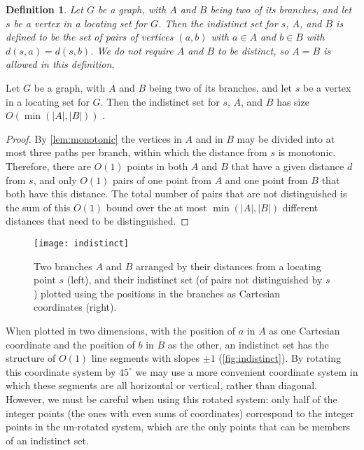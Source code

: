 \documentclass{jgaa-art}
\newtheorem{definition}{Definition}
\begin{document}
\begin{definition}
Let $G$ be a graph, with $A$ and $B$ being two of its branches, and let $s$ be a vertex in a locating set for $G$.
Then the \emph{indistinct set} for $s$, $A$, and $B$ is defined to be the set of pairs  of vertices $(a,b)$ with $a\in A$ and $b\in B$ with $d(s,a)=d(s,b)$. We do not require $A$ and $B$ to be distinct, so $A=B$ is allowed in this definition.
\end{definition}

\begin{lemma}
Let $G$ be a graph, with $A$ and $B$ being two of its branches, and let $s$ be a vertex in a locating set for $G$.
Then the indistinct set for $s$, $A$, and $B$ has size $O(\min(|A|,|B|))$ .
\end{lemma}

\begin{proof}
By \autoref{lem:monotonic} the vertices in $A$ and in $B$ may be divided into at most three paths per branch, within which the distance from $s$ is monotonic.
Therefore, there are $O(1)$ points in both $A$ and $B$ that have a given distance $d$ from $s$,
and only $O(1)$ pairs of one point from $A$ and one point from $B$ that both have this distance.
The total number of pairs that are not distinguished is the sum of this $O(1)$ bound over
the at most $\min(|A|,|B|)$ different distances that need to be distinguished.
\end{proof}

\begin{figure}[t]
\centering\texttt{[image: indistinct]}
\caption{Two branches $A$ and $B$ arranged by their distances from a locating point $s$ (left), and their indistinct set (of pairs not distinguished by $s$) plotted using the positions in the branches as Cartesian coordinates (right).}
\label{fig:indistinct}
\end{figure}

When plotted in two dimensions, with the position of $a$ in $A$ as one Cartesian coordinate and the position of $b$ in $B$ as the other, an indistinct set has the structure of $O(1)$ line segments with slopes $\pm 1$ (\autoref{fig:indistinct}). By rotating this coordinate system by $45^\circ$ we may use a more convenient coordinate system in which these segments are all horizontal or vertical, rather than diagonal. However, we must be careful when using this rotated system: only half of the integer points (the ones with even sums of coordinates) correspond to the integer points in the un-rotated system, which are the only points that can be members of an indistinct set.
\end{document}
